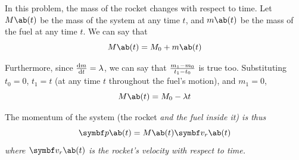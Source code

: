 In this problem, the mass of the rocket changes with respect to time.
Let \(M\ab(t)\) be the mass
of the system at any time \(t\), and \(m\ab(t)\) be the mass of the fuel at any
time \(t\).
We can say that
\begin{equation}
  M\ab(t) = M_0 + m\ab(t)
\end{equation}

Furthermore, since \(\odv{m}{t}=\lambda\), we can say that
\(\frac{m_1 - m_0}{t_1-t_0}\) is true too. Substituting \(t_0 = 0\),
\(t_1 = t\) (at any time \(t\) throughout the fuel's motion), and \(m_1 = 0\),
\begin{equation}
  M\ab(t) = M_0 - \lambda t
  \label{eq:systemmass}
\end{equation}

The momentum of the system (the rocket \it{and} the fuel inside it) is thus
\begin{equation}
  \mv{p}\ab(t) = M\ab(t)\mv{v}_r\ab(t)
  \label{eq:sysp}
\end{equation}
where \(\mv{v}_r\ab(t)\) is the rocket's velocity with respect to time.


